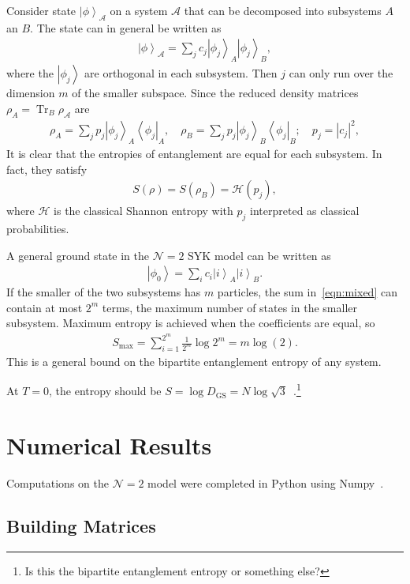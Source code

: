 \documentclass[12pt]{article} %
\renewcommand{\cal}{\mathcal}
\renewcommand{\th}[1]{\frac{1}{#1}}
\newcommand{\ket}[1]{\left|#1\right\rangle}
\newcommand{\bra}[1]{\left\langle#1\right|}
\DeclareMathOperator{\Tr}{Tr}
\begin{document}
Consider state $\ket{\phi}_\cal{A}$ on a system $\cal A$ that can be decomposed into subsystems $A$ an $B$. The state can in general be written as 
\begin{align}
\ket{\phi}_\cal{A} = \sum_jc_j\ket{\phi_j}_A\ket{\phi_j}_B,
\end{align}
where the $\ket{\phi_j}$ are orthogonal in each subsystem. Then $j$ can only run over the dimension $m$ of the smaller subspace. Since the reduced density matrices $\rho_A = \Tr_B\rho_{\cal A}$ are
\begin{align}
\rho_A = \sum_jp_j\ket{\phi_j}_A\bra{\phi_j}_A, \quad \rho_B = \sum_jp_j\ket{\phi_j}_B\bra{\phi_j}_B; \quad p_j = |c_j|^2,
\end{align}
It is clear that the entropies of entanglement are equal for each subsystem. In fact, they satisfy 
\begin{align}
S(\rho) = S(\rho_B) = \cal{H}(p_j),
\end{align}
where $\cal H$ is the classical Shannon entropy with $p_j$ interpreted as classical probabilities. 

A general ground state in the $\cal N=2$ SYK model can be written as 
\begin{align}
\ket{\phi_0} = \sum_ic_i\ket{i}_A\ket{i}_B. \label{eqn:mixed}
\end{align}
If the smaller of the two subsystems has $m$ particles, the sum in~\ref{eqn:mixed} can contain at most $2^m$ terms, the maximum number of states in the smaller subsystem. Maximum entropy is achieved when the coefficients are equal, so 
\begin{align}
S_\text{max} = \sum_{i=1}^{2^m}\th{2^m}\log 2^m = m\log(2).\label{eqn:thermal}
\end{align}
This is a general bound on the bipartite entanglement entropy of any system.

At $T=0$, the entropy should be $S = \log D_\text{GS} = N\log\sqrt{3} $~\cite{fu16}.\footnote{Is this the bipartite entanglement entropy or something else?}

\section{Numerical Results} \label{sec:numeric}

Computations on the $\cal N=2$ model were completed in Python using Numpy~\cite{vander11}.

\subsection{Building Matrices}\emph{} \label{sub:build_mat}
\end{document}
